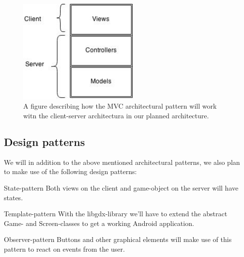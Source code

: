 \begin{figure}[h]
  \centering
    \includegraphics[width=60mm]{figs/mvc+client-server.jpg}
  \caption{A figure describing how the MVC architectural pattern will work witn the client-server architectura in our planned architecture.}
\label{fig:mvc+client-server}
\end{figure}


\subsection{Design patterns}
We will in addition to the above mentioned architectural patterns, we also plan to make use of the following design patterns:
\begin{description}
    \item{State-pattern} Both views on the client and game-object on the server will have states. 
    \item{Template-pattern} With the libgdx-library we'll have to extend the abstract Game- and Screen-classes to get a working Android application.
    \item{Observer-pattern} Buttons and other graphical elements will make use of this pattern to react on events from the user.
\end{description}